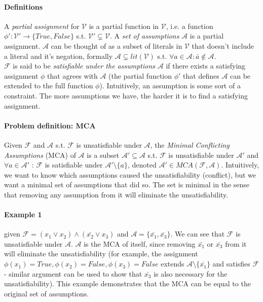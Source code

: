 \documentclass[]{article}
\begin{document}
	\paragraph{Definitions} A \textit{partial assignment} for $ \mathcal{V} $ is a partial function in $ \mathcal{V} $, i.e. a function $ \phi' : \mathcal{V}' \rightarrow \{True, False\} $ s.t. $\mathcal{V}' \subsetneq \mathcal{V}$. A \textit{set of assumptions} $ \mathcal{A} $ is a partial assignment. $ \mathcal{A} $ can be thought of as a subset of literals in $\mathcal{V}$ that doesn't include a literal and it's negation, formally $ \mathcal{A} \subsetneq lit(\mathcal{V}) $ s.t. $ \forall a \in \mathcal{A} : \bar{a} \notin \mathcal{A} $.\\
	$ \mathcal{F} $ is said to be \textit{satisfiable under the assumptions} $ \mathcal{A} $ if there exists a satisfying assignment $ \phi $ that agrees with $ \mathcal{A} $ (the partial function $ \phi' $ that defines $ \mathcal{A} $ can be extended to the full function $ \phi $). Intuitively, an assumption is some sort of a constraint. The more assumptions we have, the harder it is to find a satisfying assignment.
	\paragraph{Problem definition: MCA} Given $ \mathcal{F} $ and $ \mathcal{A} $ s.t. $ \mathcal{F} $ is unsatisfiable under $ \mathcal{A} $, the \textit{Minimal Conflicting Assumptions} (MCA) of $ \mathcal{A} $ is a subset $ \mathcal{A}' \subseteq \mathcal{A} $ s.t. $ \mathcal{F} $ is unsatisfiable under $ \mathcal{A}' $ and $ \forall a \in \mathcal{A}' $ : $ \mathcal{F} $ is satisfiable under $ \mathcal{A}' \setminus \{a\} $, denoted $ \mathcal{A}' \in MCA(\mathcal{F},\mathcal{A}) $. Intuitively, we want to know which assumptions caused the unsatisfiability (conflict), but we want a minimal set of assumptions that did so. The set is minimal in the sense that removing any assumption from it will eliminate the unsatisfiability.\\
	\paragraph{Example 1 } given  $\mathcal{F} = (x_1 \lor x_2) \land (\bar{x_2} \lor x_3)$ and $\mathcal{A} =\{\bar{x_1}, \bar{x_3}\}$. We can see that $ \mathcal{F} $ is unsatisfiable under $ \mathcal{A} $. $ \mathcal{A} $ is the MCA of itself, since removing $\bar{x_1}$ or $\bar{x_3}$ from it will eliminate the unsatisfiability (for example, the assignment $ \phi(x_1)=True,\phi(x_2)=False, \phi(x_3)=False $ extends $ \mathcal{A} \setminus \{\bar{x_1}\} $ and satisfies $\mathcal{F}$ - similar argument can be used to show that $\bar{x_3}$ is also necessary for the unsatisfiability). This example demonstrates that the MCA can be equal to the original set of assumptions.
\end{document}
